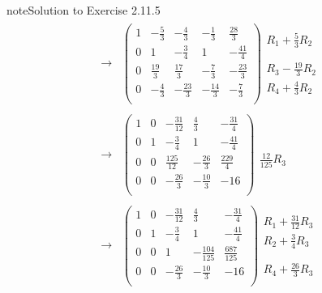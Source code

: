 \documentclass[letterpaper,10pt,english]{jupyterBook}
\begin{document}
\begin{sphinxadmonition}{note}{Solution to Exercise 2.11.5}
\begin{equation*}
\begin{split}
\begin{align*}
    \longrightarrow 
    & \left( \begin{array}{cccc|c} 
         1 & - \frac{5}{3} & - \frac{4}{3} & - \frac{1}{3} & \frac{28}{3} \\ 
         0 & 1 & - \frac{3}{4} & 1 & - \frac{41}{4} \\ 
         0 & \frac{19}{3} & \frac{17}{3} & - \frac{7}{3} & - \frac{23}{3} \\ 
         0 & - \frac{4}{3} & - \frac{23}{3} & - \frac{14}{3} & - \frac{7}{3} \\ 
    \end{array} \right) 
    \begin{array}{l} R_{1} + \frac{5}{3} R_{2}\\ \phantom{x} \\ R_{3} - \frac{19}{3} R_{2} \\ R_{4} + \frac{4}{3} R_{2}\end{array} \\ \\ 
    \longrightarrow 
    & \left( \begin{array}{cccc|c} 
         1 & 0 & - \frac{31}{12} & \frac{4}{3} & - \frac{31}{4} \\ 
         0 & 1 & - \frac{3}{4} & 1 & - \frac{41}{4} \\ 
         0 & 0 & \frac{125}{12} & - \frac{26}{3} & \frac{229}{4} \\ 
         0 & 0 & - \frac{26}{3} & - \frac{10}{3} & -16 \\ 
    \end{array} \right) 
    \begin{array}{l} \phantom{x} \\ \phantom{x} \\ \frac{12}{125} R_{3}\\ \phantom{x} \end{array} \\ \\ 
    \longrightarrow 
    & \left( \begin{array}{cccc|c} 
         1 & 0 & - \frac{31}{12} & \frac{4}{3} & - \frac{31}{4} \\ 
         0 & 1 & - \frac{3}{4} & 1 & - \frac{41}{4} \\ 
         0 & 0 & 1 & - \frac{104}{125} & \frac{687}{125} \\ 
         0 & 0 & - \frac{26}{3} & - \frac{10}{3} & -16 \\ 
    \end{array} \right) 
    \begin{array}{l} R_{1} + \frac{31}{12} R_{3}\\ R_{2} + \frac{3}{4} R_{3}\\ \phantom{x} \\ R_{4} + \frac{26}{3} R_{3}\end{array} \\ \\ 

\end{align*}
\end{split}
\end{equation*}
\end{sphinxadmonition}
\end{document}
